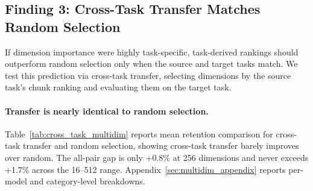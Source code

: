 \documentclass[11pt,a4paper]{article}
\begin{document}
\begin{table}[t]
    \centering
    \caption{Random selection vs. projection-based compression, comparing random selection (RS), PCA, and random projection (RP) at 64 and 256 dimensions across representative models.}
    \label{tab:pca_comparison}
    \small
\end{table}

\subsection{Finding 3: Cross-Task Transfer Matches Random Selection}
\label{sec:finding3}

If dimension importance were highly task-specific, task-derived rankings should outperform random selection only when the source and target tasks match. We test this prediction via cross-task transfer, selecting dimensions by the source task's chunk ranking and evaluating them on the target task.

\paragraph{Transfer is nearly identical to random selection.}
Table~\ref{tab:cross_task_multidim} reports mean retention comparison for cross-task transfer and random selection, showing cross-task transfer barely improves over random. The all-pair gap is only +0.8\% at 256 dimensions and never exceeds +1.7\% across the 16--512 range. Appendix~\ref{sec:multidim_appendix} reports per-model and category-level breakdowns.
\end{document}
